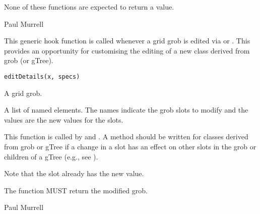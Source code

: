 %
\begin{Value}
None of these functions are expected to return a value.
\end{Value}
%
\begin{Author}\relax
 Paul Murrell 
\end{Author}
%
\begin{SeeAlso}\relax
\end{SeeAlso}
%
\begin{Description}\relax
This generic hook function is called whenever a grid grob is edited
via  or .
This provides an opportunity for customising the editing of a
new class derived from grob (or gTree).
\end{Description}
%
\begin{Usage}
\begin{verbatim}
editDetails(x, specs)
\end{verbatim}
\end{Usage}
%
\begin{Arguments}
\begin{ldescription}
\item[\code{x}]  A grid grob. 
\item[\code{specs}]  A list of named elements.  The names indicate the
grob slots to modify and the values are the new values for the slots. 
\end{ldescription}
\end{Arguments}
%
\begin{Details}\relax
This function is called by  and .
A method should be written for classes derived from grob or gTree
if a change in a slot has an effect on other slots in the grob or
children of a gTree (e.g., see ).

Note that the slot already has the new value.
\end{Details}
%
\begin{Value}
The function MUST return the modified grob.
\end{Value}
%
\begin{Author}\relax
 Paul Murrell 
\end{Author}
%
\begin{SeeAlso}\relax
\end{SeeAlso}

